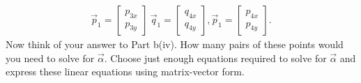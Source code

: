 \documentclass[11pt]{article}
\begin{document}
\begin{enumerate}
\begin{enumerate}
\[\begin{aligned}
                              \vec p_1 = \begin{bmatrix}
                                            p_{3x} \\
                                            p_{3y}
                                       \end{bmatrix} \
                              \vec q_1 = \begin{bmatrix}
                                            q_{4x} \\
                                            q_{4y}
                                       \end{bmatrix},
                              \vec p_1 = \begin{bmatrix}
                                            p_{4x} \\
                                            p_{4y}
                                       \end{bmatrix}.
                        \end{aligned}\]
                Now think of your answer to Part b(iv). How many pairs of these points would you need to solve for
                $\vec \alpha$. Choose just enough equations required to solve for $\vec \alpha$ and express these linear equations using
                matrix-vector form.
       \end{enumerate}
   
         
   

\end{enumerate}
\end{document}
